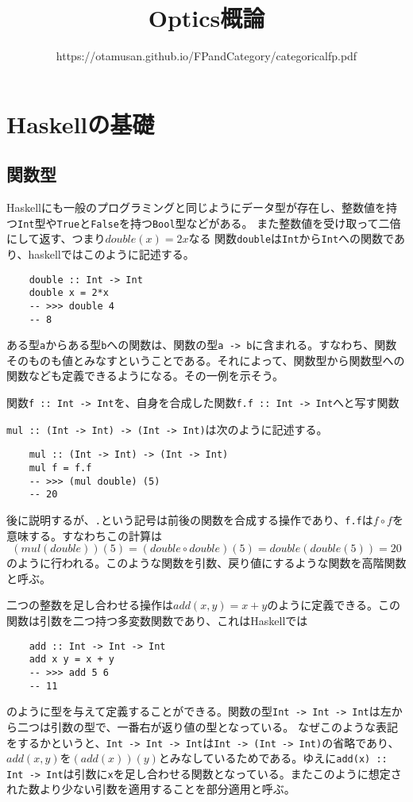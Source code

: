 \documentclass[uplatex,dvipdfmx]{jsarticle}
\newcommand{\pr}[1]{\colorbox[rgb]{0.9,0.9,0.9}{\lstinline{#1}}}
\newcommand{\functype}[2]{\pr{#1 -> #2}}
\newcommand{\fpmor}[3]{\pr{#1 :: #2 -> #3}}
\begin{document}
  \title{Optics概論}
  \author{https://otamusan.github.io/FPandCategory/categoricalfp.pdf}
  \maketitle
	\tableofcontents
  \pagebreak
  \section{Haskellの基礎}
  \subsection{関数型}
  Haskellにも一般のプログラミングと同じようにデータ型が存在し、整数値を持つ\pr{Int}型や\pr{True}と\pr{False}を持つ\pr{Bool}型などがある。
  また整数値を受け取って二倍にして返す、つまり$double(x)=2x$なる
  関数\pr{double}は\pr{Int}から\pr{Int}への関数であり、haskellではこのように記述する。
  \begin{lstlisting}
    double :: Int -> Int
    double x = 2*x
    -- >>> double 4
    -- 8
  \end{lstlisting}
  ある型\pr{a}からある型\pr{b}への関数は、関数の型\functype{a}{b}に含まれる。すなわち、関数そのものも値とみなすということである。それによって、関数型から関数型への関数なども定義できるようになる。その一例を示そう。

  関数\fpmor{f}{Int}{Int}を、自身を合成した関数\fpmor{f.f}{Int}{Int}へと写す関数
  
  \fpmor{mul}{(Int -> Int)}{(Int -> Int)}は次のように記述する。
  \begin{lstlisting}
    mul :: (Int -> Int) -> (Int -> Int)
    mul f = f.f
    -- >>> (mul double) (5)
    -- 20
  \end{lstlisting}
  後に説明するが、\pr{.}という記号は前後の関数を合成する操作であり、\pr{f.f}は$f\circ f$を意味する。すなわちこの計算は
  \[(mul(double))(5)=(double \circ double)(5)=double(double(5))=20\]のように行われる。このような関数を引数、戻り値にするような関数を高階関数と呼ぶ。
  
  二つの整数を足し合わせる操作は$add(x,y)=x+y$のように定義できる。この関数は引数を二つ持つ多変数関数であり、これはHaskellでは
  \begin{lstlisting}
    add :: Int -> Int -> Int
    add x y = x + y
    -- >>> add 5 6
    -- 11
  \end{lstlisting}
  のように型を与えて定義することができる。関数の型\pr{Int -> Int -> Int}は左から二つは引数の型で、一番右が返り値の型となっている。
  なぜこのような表記をするかというと、\pr{Int -> Int -> Int}は\pr{Int -> (Int -> Int)}の省略であり、$add(x,y)$を$(add(x))(y)$とみなしているためである。ゆえに\fpmor{add(x)}{Int}{Int}は引数に\pr{x}を足し合わせる関数となっている。またこのように想定された数より少ない引数を適用することを部分適用と呼ぶ。
\end{document}
